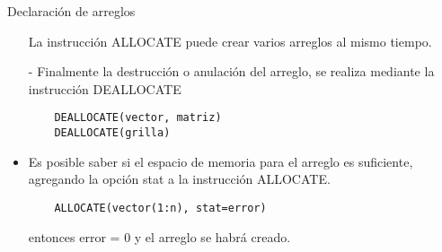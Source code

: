 \begin{frame}[fragile]{Declaración de arreglos}
 \begin{itemize}[<+(0)->]
  \item [] La instrucción ALLOCATE puede crear varios arreglos al mismo tiempo.
  \item [-] Finalmente la destrucción o anulación del arreglo, se realiza mediante la instrucción DEALLOCATE
  \vspace{0.15 cm}
  \item [] 
    \begin{verbatim}
    DEALLOCATE(vector, matriz)
    DEALLOCATE(grilla)
    \end{verbatim}
  \item Es posible saber si el espacio de memoria para el arreglo es suficiente, agregando la opción stat a la instrucción ALLOCATE.
  \vspace{0.15 cm}
  \item [] 
    \begin{verbatim}
    ALLOCATE(vector(1:n), stat=error)
    \end{verbatim}
  \item [] entonces error = 0 y el arreglo se habrá creado.    
 \end{itemize}
\end{frame}